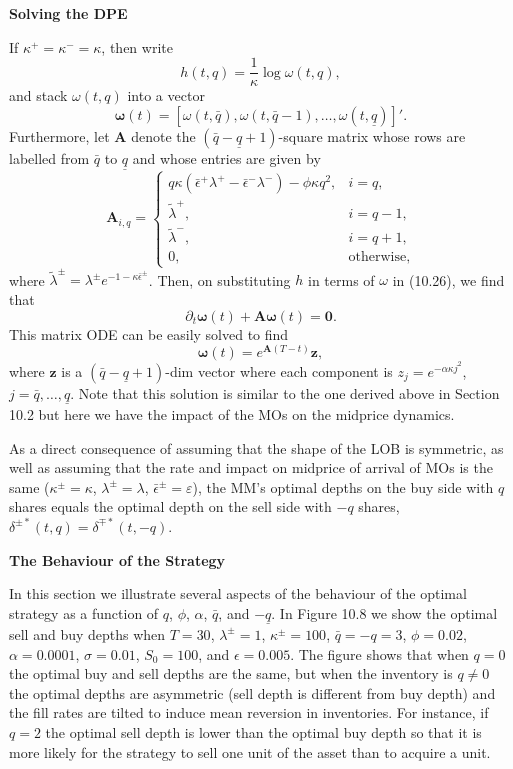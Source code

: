 \documentclass[11pt, a4paper]{book}
\begin{document}
	\textbf{Solving the DPE}
	
	If $\kappa^+ = \kappa^- = \kappa$, then write
	\[
	h(t, q) = \frac{1}{\kappa} \log \omega(t, q),
	\]
	and stack $\omega(t, q)$ into a vector
	\[
	\bm{\omega}(t) = [\omega(t, \bar{q}), \omega(t, \bar{q}-1), \dots, \omega(t, \underline{q})]'.
	\]
	Furthermore, let $\mathbf{A}$ denote the $(\bar{q} - \underline{q} + 1)$-square matrix whose rows are labelled from $\bar{q}$ to $\underline{q}$ and whose entries are given by
	\begin{equation}
		\mathbf{A}_{i,q} = \begin{cases}
			q \kappa (\bar{\epsilon}^+ \lambda^+ - \bar{\epsilon}^- \lambda^-) - \phi \kappa q^2, & i = q, \\
			\tilde{\lambda}^+, & i = q - 1, \\
			\tilde{\lambda}^-, & i = q + 1, \\
			0, & \text{otherwise},
		\end{cases} \label{eq:10.28}
	\end{equation}
	where $\tilde{\lambda}^\pm = \lambda^\pm e^{-1-\kappa \bar{\epsilon}^\pm}$. Then, on substituting $h$ in terms of $\omega$ in (10.26), we find that
	\[
	\partial_t \bm{\omega}(t) + \mathbf{A} \bm{\omega}(t) = \mathbf{0}.
	\]
	This matrix ODE can be easily solved to find
	\begin{equation}
		\boxed{\bm{\omega}(t) = e^{\mathbf{A}(T-t)} \mathbf{z},} \label{eq:10.29}
	\end{equation}
	where $\mathbf{z}$ is a $(\bar{q} - \underline{q} + 1)$-dim vector where each component is $z_j = e^{-\alpha \kappa j^2}$, $j = \bar{q}, \dots, \underline{q}$. Note that this solution is similar to the one derived above in Section 10.2 but here we have the impact of the MOs on the midprice dynamics.
	
	As a direct consequence of assuming that the shape of the LOB is symmetric, as well as assuming that the rate and impact on midprice of arrival of MOs is the same ($\kappa^\pm = \kappa$, $\lambda^\pm = \lambda$, $\bar{\epsilon}^\pm = \varepsilon$), the MM's optimal depths on the buy side with $q$ shares equals the optimal depth on the sell side with $-q$ shares, $\delta^{\pm *}(t, q) = \delta^{\mp *}(t, -q)$.
	
	\textbf{The Behaviour of the Strategy}
	
	In this section we illustrate several aspects of the behaviour of the optimal strategy as a function of $q$, $\phi$, $\alpha$, $\bar{q}$, and $-\underline{q}$. In Figure 10.8 we show the optimal sell and buy depths when $T = 30$, $\lambda^\pm = 1$, $\kappa^\pm = 100$, $\bar{q} = -q = 3$, $\phi = 0.02$, $\alpha = 0.0001$, $\sigma = 0.01$, $S_0 = 100$, and $\epsilon = 0.005$. The figure shows that when $q = 0$ the optimal buy and sell depths are the same, but when the inventory is $q \neq 0$ the optimal depths are asymmetric (sell depth is different from buy depth) and the fill rates are tilted to induce mean reversion in inventories. For instance, if $q = 2$ the optimal sell depth is lower than the optimal buy depth so that it is more likely for the strategy to sell one unit of the asset than to acquire a unit.
	
\end{document}
